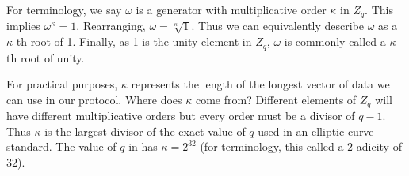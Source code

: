 For terminology, we say \(\omega\) is a generator with multiplicative order \(\kappa\) in \(Z_q\). This implies \(\omega^\kappa=1\). Rearranging, \(\omega=\sqrt[\kappa]{1}\). Thus we can equivalently describe \(\omega\) as a \(\kappa\)-th root of 1. Finally, as 1 is the unity element in \(Z_q\), \(\omega\) is commonly called a \(\kappa\)-th root of unity.

For practical purposes, \(\kappa\) represents the length of the longest vector of data we can use in our protocol. Where does \(\kappa\) come from? Different elements of \(Z_q\) will have different multiplicative orders but every order must be a divisor of \(q-1\). Thus \(\kappa\) is the largest divisor of the exact value of \(q\) used in an elliptic curve standard. The value of $q$ in \bls has \(\kappa=2^{32}\) (for terminology, this called a \(2\)-adicity of \(32\)).

